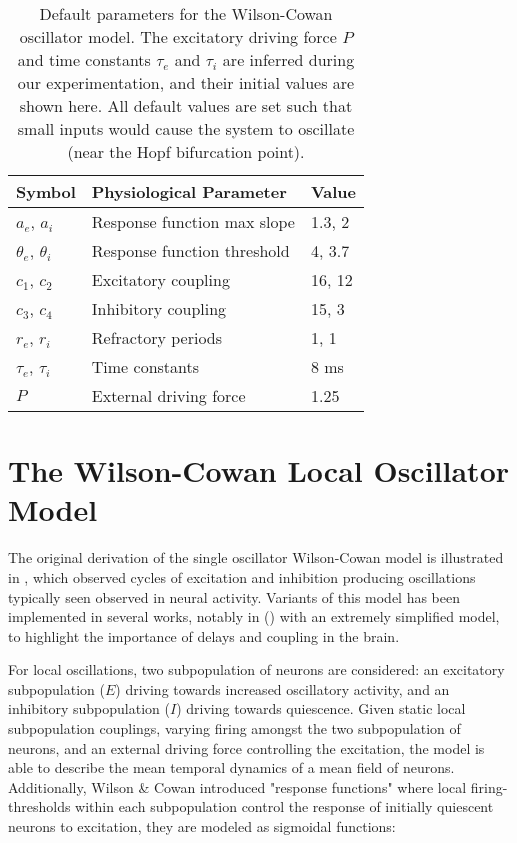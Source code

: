 \begin{table}[ht]
    \centering
    \caption{Default parameters for the Wilson-Cowan oscillator model. The excitatory driving force $P$ and time constants $\tau_e$ and $\tau_i$ are inferred during our experimentation, and their initial values are shown here. All default values are set such that small inputs would cause the system to oscillate (near the Hopf bifurcation point).}
    \begin{tabular}{lll}
    \toprule
    \cmidrule(r){1-2}
    Symbol                 &  Physiological Parameter     & Value \\
    \midrule
    $a_e$, $a_i$           &  Response function max slope & 1.3, 2 \\
    $\theta_e$, $\theta_i$ &  Response function threshold & 4, 3.7 \\
    $c_1$, $c_2$           &  Excitatory coupling         & 16, 12 \\
    $c_3$, $c_4$           &  Inhibitory coupling         & 15, 3  \\
    $r_e$, $r_i$           &  Refractory periods          & 1, 1 \\
    $\tau_e$, $\tau_i$     &  Time constants              & 8 ms \\
    $P$                    &  External driving force      & 1.25 \\
    \bottomrule
    \end{tabular}
    \label{tab:oscillator_parameters}
\end{table}

\section{The Wilson-Cowan Local Oscillator Model}
The original derivation of the single oscillator Wilson-Cowan model is illustrated in \cite{Wilson1972}, which observed cycles of excitation and inhibition producing oscillations typically seen observed in neural activity. Variants of this model has been implemented in several works, notably in (\cite{Deco2009}) with an extremely simplified model, to highlight the importance of delays and coupling in the brain. 

For local oscillations, two subpopulation of neurons are considered: an excitatory subpopulation ($E$) driving towards increased oscillatory activity, and an inhibitory subpopulation ($I$) driving towards quiescence. Given static local subpopulation couplings, varying firing amongst the two subpopulation of neurons, and an external driving force controlling the excitation, the model is able to describe the mean temporal dynamics of a mean field of neurons. Additionally, Wilson \& Cowan introduced "response functions" where local firing-thresholds within each subpopulation control the response of initially quiescent neurons to excitation, they are modeled as sigmoidal functions: 


